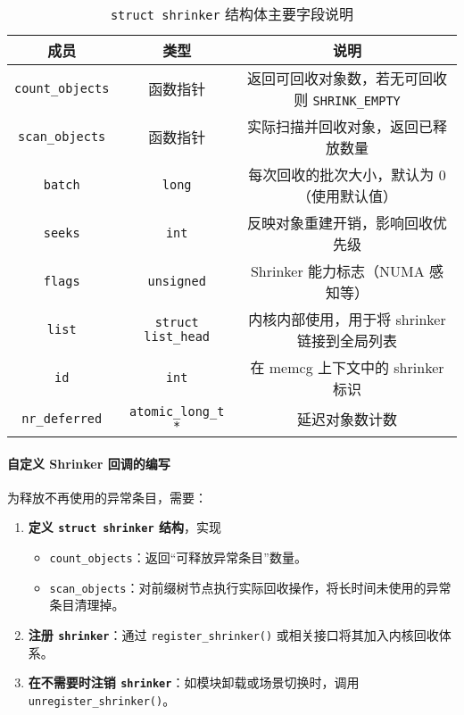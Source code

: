 \begin{table}[htbp]
  \centering
  \caption{\texttt{struct shrinker} 结构体主要字段说明}
  \label{tab:shrinker_struct}
  \begin{tabular}{ccc}
    \toprule
    \textbf{成员} & \textbf{类型} & \textbf{说明} \\
    \midrule
    \texttt{count\_objects} & 函数指针 & 返回可回收对象数，若无可回收则 \texttt{SHRINK\_EMPTY} \\
    \texttt{scan\_objects} & 函数指针 & 实际扫描并回收对象，返回已释放数量 \\
    \texttt{batch} & \texttt{long} & 每次回收的批次大小，默认为 0（使用默认值） \\
    \texttt{seeks} & \texttt{int} & 反映对象重建开销，影响回收优先级 \\
    \texttt{flags} & \texttt{unsigned} & Shrinker 能力标志（NUMA 感知等） \\
    \texttt{list} & \texttt{struct list\_head} & 内核内部使用，用于将 shrinker 链接到全局列表 \\
    \texttt{id} & \texttt{int} & 在 memcg 上下文中的 shrinker 标识 \\
    \texttt{nr\_deferred} & \texttt{atomic\_long\_t *} & 延迟对象数计数 \\
    \bottomrule
  \end{tabular}
\end{table}

\paragraph{自定义 Shrinker 回调的编写}

为释放不再使用的异常条目，需要：
\begin{enumerate}
  \item \textbf{定义 \texttt{struct shrinker} 结构}，实现
  \begin{itemize}
    \item \texttt{count\_objects}：返回“可释放异常条目”数量。
    \item \texttt{scan\_objects}：对前缀树节点执行实际回收操作，将长时间未使用的异常条目清理掉。
  \end{itemize}
  \item \textbf{注册 \texttt{shrinker}}：通过 \texttt{register\_shrinker()} 或相关接口将其加入内核回收体系。
  \item \textbf{在不需要时注销 \texttt{shrinker}}：如模块卸载或场景切换时，调用 \texttt{unregister\_shrinker()}。
\end{enumerate}

